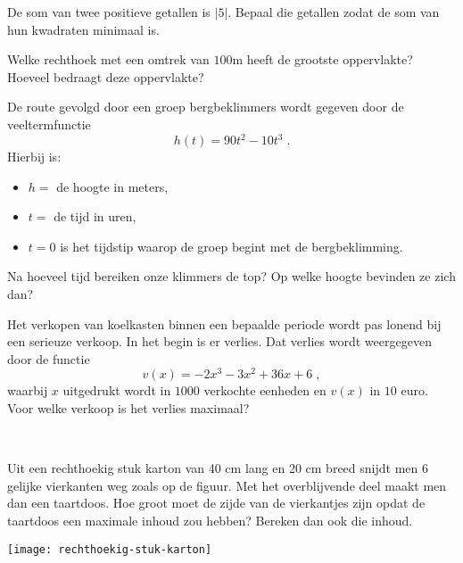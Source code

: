 \documentclass[a4paper,12pt,twoside]{article}
\begin{document}
\begin{oefening}
  De som van twee positieve getallen is $|5|$. Bepaal die getallen zodat de som van hun kwadraten minimaal is.
\end{oefening}

\begin{oefening}
  Welke rechthoek met een omtrek van $100$m heeft de grootste oppervlakte? Hoeveel bedraagt deze oppervlakte?
\end{oefening}

\begin{oefening}
  De route gevolgd door een groep bergbeklimmers wordt gegeven door de veeltermfunctie
  $$h(t)=90t^2-10t^3\;.$$
  Hierbij is:
  \begin{itemize}
  \item $h=$ de hoogte in meters,
  \item $t=$ de tijd in uren,
  \item $t=0$ is het tijdstip waarop de groep begint met de bergbeklimming.
  \end{itemize}
  Na hoeveel tijd bereiken onze klimmers de top? Op welke hoogte bevinden ze zich dan?
\end{oefening}

\begin{oefening}
  Het verkopen van koelkasten binnen een bepaalde periode wordt pas lonend bij een serieuze verkoop. In het begin is er verlies. Dat verlies wordt weergegeven door de functie
  $$v(x)=-2x^3-3x^2+36x+6\;,$$
  waarbij $x$ uitgedrukt wordt in $1000$ verkochte eenheden en $v(x)$ in $10$ euro. Voor welke verkoop is het verlies maximaal?
\end{oefening}

\begin{oefening}\\
  \begin{minipage}{0.6\textwidth}
    Uit een rechthoekig stuk karton van 40 cm lang en 20 cm breed snijdt men 6 gelijke
    vierkanten weg zoals op de figuur. Met het overblijvende deel maakt men dan een
    taartdoos. Hoe groot moet de zijde van de vierkantjes zijn opdat de taartdoos een
    maximale inhoud zou hebben? Bereken dan ook die inhoud.
  \end{minipage}
  \begin{minipage}{0.4\textwidth}
    \centering
    \texttt{[image: rechthoekig-stuk-karton]}
  \end{minipage}
\end{oefening}
\end{document}

